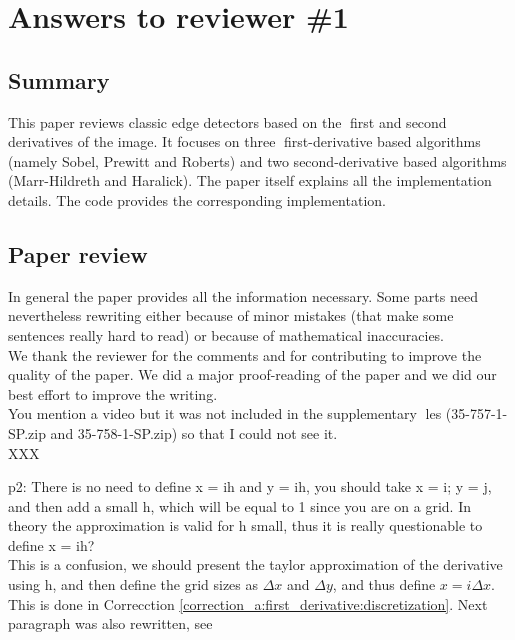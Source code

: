 \documentclass[a4paper,10pt]{report}
\begin{document}
\chapter{Answers to reviewer \#1}

\section{Summary}

\que This paper reviews classic edge detectors based on the first and second derivatives of the image. It focuses
on three first-derivative based algorithms (namely Sobel, Prewitt and Roberts) and two second-derivative
based algorithms (Marr-Hildreth and Haralick). The paper itself explains all the implementation details.
The code provides the corresponding implementation.\\

\section{Paper review}

\que In general the paper provides all the information necessary. Some parts need nevertheless rewriting either because of minor mistakes (that make some sentences really hard to read) or because of mathematical inaccuracies.\\

\ans We thank the reviewer for the comments and for contributing to improve the quality of the paper. We did a major proof-reading of the paper and we did our best effort to improve the writing.\\

\que You mention a video but it was not included in the supplementary les (35-757-1-SP.zip and 35-758-1-SP.zip) so that I could not see it.\\

\ans XXX

\que p2: There is no need to define x = ih and y = ih, you should take x = i; y = j, and then add a small h, which will be equal to 1 since you are on a grid. In theory the approximation is valid for h small, thus it is really questionable to define x = ih? \\

\ans This is a confusion, we should present the taylor approximation of the derivative using h, and then define the grid sizes as $\Delta x$ and $\Delta y$, and thus define $x=i\Delta x$. This is done in Correcction \ref{correction_a:first_derivative:discretization}. Next paragraph was also rewritten, see \\
\end{document}
